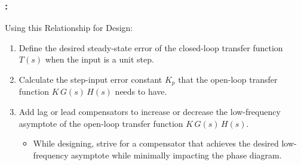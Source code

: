 \documentclass[ 10pt, xcolor = dvipsnames]{beamer}
\begin{document}
\begin{frame}[allowframebreaks]
\frametitle{\insertsection: \insertsubsection}

Using this Relationship for Design: 
\begin{enumerate}
\item Define the desired steady-state error of the closed-loop \linebreak transfer function $T(s)$ when the input is a unit step. 
\item Calculate the step-input error constant $K_p$ that the open-loop transfer function $K \, G(s) \, H(s)$ needs to have. 
\item Add lag or lead compensators to increase or decrease the low-frequency asymptote of the open-loop transfer function $K \, G(s) \, H(s)$. 
\begin{itemize}
\item While designing, strive for a compensator that achieves the desired \linebreak low-frequency asymptote while minimally impacting the phase diagram. 
\end{itemize}
\end{enumerate}

\end{frame}
\end{document}
